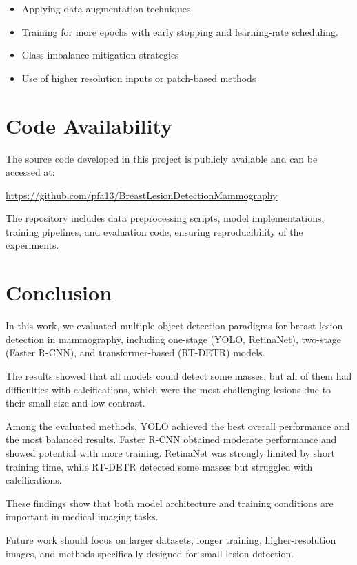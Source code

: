\documentclass[12pt,a4paper]{article} %
\begin{document}
\begin{itemize}
    \item Applying data augmentation techniques.
    \item Training for more epochs with early stopping and learning-rate scheduling.
    \item Class imbalance mitigation strategies
    \item Use of higher resolution inputs or patch-based methods
\end{itemize}

\section{Code Availability}

The source code developed in this project is publicly available and can be accessed at:

\begin{center}
\url{https://github.com/pfa13/BreastLesionDetectionMammography}
\end{center}

The repository includes data preprocessing scripts, model implementations, training pipelines, and evaluation code, ensuring reproducibility of the experiments.

\section{Conclusion}

In this work, we evaluated multiple object detection paradigms for breast lesion detection in mammography, including one-stage (YOLO, RetinaNet), two-stage (Faster R-CNN), and transformer-based (RT-DETR) models.

The results showed that all models could detect some masses, but all of them had difficulties with calcifications, which were the most challenging lesions due to their small size and low contrast.

Among the evaluated methods, YOLO achieved the best overall performance and the most balanced results. Faster R-CNN obtained moderate performance and showed potential with more training. RetinaNet was strongly limited by short training time, while RT-DETR detected some masses but struggled with calcifications.

These findings show that both model architecture and training conditions are important in medical imaging tasks.

Future work should focus on larger datasets, longer training, higher-resolution images, and methods specifically designed for small lesion detection.
\end{document}
